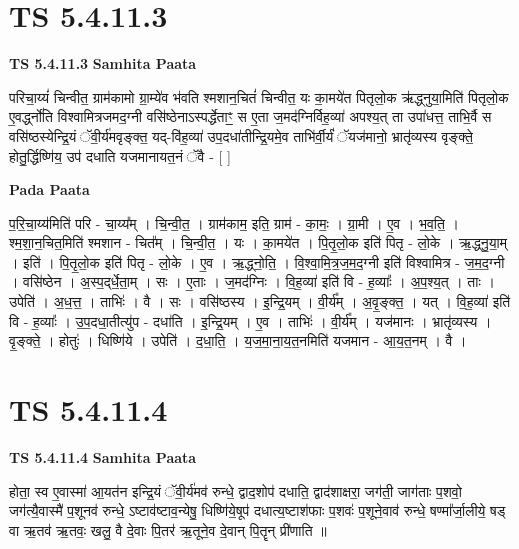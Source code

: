 \documentclass[17pt]{extarticle}
\begin{document}

\section{ TS 5.4.11.3 }

\textbf{TS 5.4.11.3 } \newline
\textbf{Samhita Paata} \newline

परिचा॒य्यं॑ चिन्वीत॒ ग्राम॑कामो ग्रा॒म्ये॑व भ॑वति श्मशान॒चितं॑ चिन्वीत॒ यः का॒मये॑त पितृलो॒क ऋ॑द्ध्नुया॒मिति॑ पितृलो॒क ए॒वर्द्ध्नो॑ति विश्वामित्रजमद॒ग्नी वसि॑ष्ठेनाऽस्पर्द्धेताꣳ॒॒ स ए॒ता ज॒मद॑ग्निर्विह॒व्या॑ अपश्य॒त् ता उपा॑धत्त॒ ताभि॒र्वै स वसि॑ष्ठस्येन्द्रि॒यं ॅवी॒र्य॑मवृङ्क्त॒ यद्-वि॑ह॒व्या॑ उप॒दधा॑तीन्द्रि॒यमे॒व ताभि॑र्वी॒र्यं॑ ॅयज॑मानो॒ भ्रातृ॑व्यस्य वृङ्क्ते॒ होतु॒र्द्धिष्णि॑य॒ उप॑ दधाति यजमानायत॒नं ॅवै - [  ] \newline

\textbf{Pada Paata} \newline

प॒रि॒चा॒य्य॑मिति॑ परि - चा॒य्य᳚म् । चि॒न्वी॒त॒ । ग्राम॑काम॒ इति॒ ग्राम॑ - का॒मः॒ । ग्रा॒मी । ए॒व । भ॒व॒ति॒ । श्म॒शा॒न॒चित॒मिति॑ श्मशान - चित᳚म् । चि॒न्वी॒त॒ । यः । का॒मये॑त । पि॒तृ॒लो॒क इति॑ पितृ - लो॒के । ऋ॒द्ध्नु॒या॒म् । इति॑ । पि॒तृ॒लो॒क इति॑ पितृ - लो॒के । ए॒व । ऋ॒द्ध्नो॒ति॒ । वि॒श्वा॒मि॒त्र॒ज॒म॒द॒ग्नी इति॑ विश्वामित्र - ज॒म॒द॒ग्नी । वसि॑ष्ठेन । अ॒स्प॒द्‌र्धे॒ता॒म् । सः । ए॒ताः । ज॒मद॑ग्निः । वि॒ह॒व्या॑ इति॑ वि - ह॒व्याः᳚ । अ॒प॒श्य॒त् । ताः । उपेति॑ । अ॒ध॒त्त॒ । ताभिः॑ । वै । सः । वसि॑ष्ठस्य । इ॒न्द्रि॒यम् । वी॒र्य᳚म् । अ॒वृ॒ङ्क्त॒ । यत् । वि॒ह॒व्या॑ इति॑ वि - ह॒व्याः᳚ । उ॒प॒दधा॒तीत्यु॑प - दधा॑ति । इ॒न्द्रि॒यम् । ए॒व । ताभिः॑ । वी॒र्य᳚म् । यज॑मानः । भ्रातृ॑व्यस्य । वृ॒ङ्क्ते॒ । होतुः॑ । धिष्णि॑ये । उपेति॑ । द॒धा॒ति॒ । य॒ज॒मा॒ना॒य॒त॒नमिति॑ यजमान - आ॒य॒त॒नम् । वै ।  \newline





\section{ TS 5.4.11.4 }

\textbf{TS 5.4.11.4 } \newline
\textbf{Samhita Paata} \newline

होता॒ स्व ए॒वास्मा॑ आ॒यत॑न इन्द्रि॒यं ॅवी॒र्य॑मव॑ रुन्धे॒ द्वाद॒शोप॑ दधाति॒ द्वाद॑शाक्षरा॒ जग॑ती॒ जाग॑ताः प॒शवो॒ जग॑त्यै॒वास्मै॑ प॒शूनव॑ रुन्धे॒ ऽष्टाव॑ष्टाव॒न्येषु॒ धिष्णि॑ये॒षूप॑ दधात्य॒ष्टाश॑फाः प॒शवः॑ प॒शूने॒वाव॑ रुन्धे॒ षण्मा᳚र्जा॒लीये॒ षड् वा ऋ॒तव॑ ऋ॒तवः॒ खलु॒ वै दे॒वाः पि॒तर॑ ऋ॒तूने॒व दे॒वान् पि॒तॄन् प्री॑णाति ॥ \newline
\end{document}
